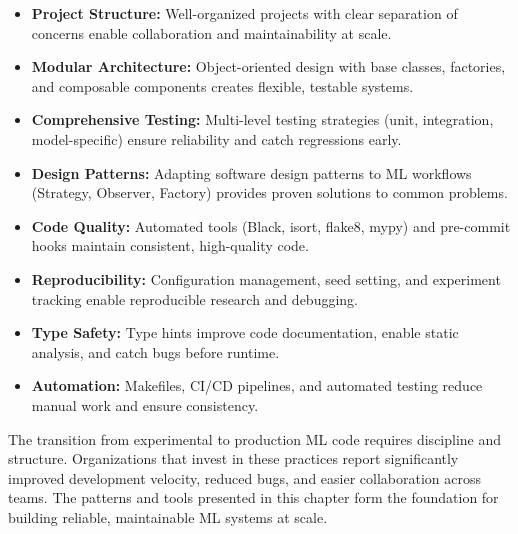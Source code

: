 \begin{itemize}
    \item \textbf{Project Structure:} Well-organized projects with clear separation of concerns enable collaboration and maintainability at scale.

    \item \textbf{Modular Architecture:} Object-oriented design with base classes, factories, and composable components creates flexible, testable systems.

    \item \textbf{Comprehensive Testing:} Multi-level testing strategies (unit, integration, model-specific) ensure reliability and catch regressions early.

    \item \textbf{Design Patterns:} Adapting software design patterns to ML workflows (Strategy, Observer, Factory) provides proven solutions to common problems.

    \item \textbf{Code Quality:} Automated tools (Black, isort, flake8, mypy) and pre-commit hooks maintain consistent, high-quality code.

    \item \textbf{Reproducibility:} Configuration management, seed setting, and experiment tracking enable reproducible research and debugging.

    \item \textbf{Type Safety:} Type hints improve code documentation, enable static analysis, and catch bugs before runtime.

    \item \textbf{Automation:} Makefiles, CI/CD pipelines, and automated testing reduce manual work and ensure consistency.
\end{itemize}

The transition from experimental to production ML code requires discipline and structure. Organizations that invest in these practices report significantly improved development velocity, reduced bugs, and easier collaboration across teams. The patterns and tools presented in this chapter form the foundation for building reliable, maintainable ML systems at scale.
